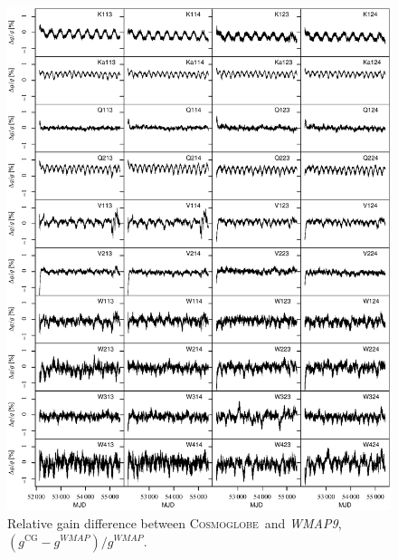 \documentclass[twocolumn]{../../common/aa}
\def\WMAPnine{\emph{WMAP9}}
\newcommand{\cosmoglobe}{\textsc{Cosmoglobe}}
\begin{document}
\begin{figure}[p]
	\centering
	\includegraphics[width=\textwidth]{figures/instpar_CG_dgain_v1.pdf}
	\caption{Relative gain difference between \cosmoglobe\ and \WMAPnine, $(g^\mathrm{CG}-g^\mathit{WMAP})/g^\mathit{WMAP}$.}
	\label{fig:dgain}
\end{figure}
\end{document}
